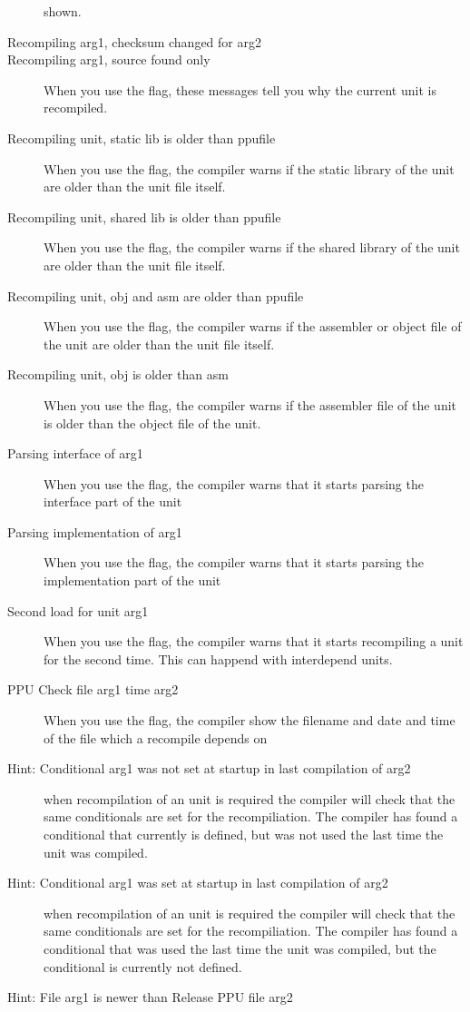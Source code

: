 \begin{description}
 shown.
\item [Recompiling arg1, checksum changed for arg2]
\item [Recompiling arg1, source found only]
 When you use the  flag, these messages tell you why the current
 unit is recompiled.
\item [Recompiling unit, static lib is older than ppufile]
 When you use the  flag, the compiler warns if the static library
 of the unit are older than the unit file itself.
\item [Recompiling unit, shared lib is older than ppufile]
 When you use the  flag, the compiler warns if the shared library
 of the unit are older than the unit file itself.
\item [Recompiling unit, obj and asm are older than ppufile]
 When you use the  flag, the compiler warns if the assembler or
 object file of the unit are older than the unit file itself.
\item [Recompiling unit, obj is older than asm]
 When you use the  flag, the compiler warns if the assembler
 file of the unit is older than the object file of the unit.
\item [Parsing interface of arg1]
 When you use the  flag, the compiler warns that it starts
 parsing the interface part of the unit
\item [Parsing implementation of arg1]
 When you use the  flag, the compiler warns that it starts
 parsing the implementation part of the unit
\item [Second load for unit arg1]
 When you use the  flag, the compiler warns that it starts
 recompiling a unit for the second time. This can happend with interdepend
 units.
\item [PPU Check file arg1 time arg2]
 When you use the  flag, the compiler show the filename and
 date and time of the file which a recompile depends on
\item [Hint: Conditional arg1 was not set at startup in last compilation of arg2]
 when recompilation of an unit is required the compiler will check that
 the same conditionals are set for the recompiliation. The compiler has
 found a conditional that currently is defined, but was not used the last
 time the unit was compiled.
\item [Hint: Conditional arg1 was set at startup in last compilation of arg2]
 when recompilation of an unit is required the compiler will check that
 the same conditionals are set for the recompiliation. The compiler has
 found a conditional that was used the last time the unit was compiled, but
 the conditional is currently not defined.
\item [Hint: File arg1 is newer than Release PPU file arg2]
 \end{description}

